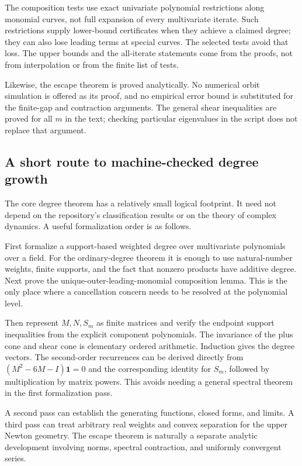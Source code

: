 \documentclass[11pt,a4paper]{article}
\numberwithin{equation}{section}
\theoremstyle{definition}
\theoremstyle{remark}
\newcommand{\one}{\mathbf 1}
\begin{document}
The composition tests use exact univariate polynomial restrictions
along monomial curves, not full expansion of every multivariate
iterate. Such restrictions supply lower-bound certificates when
they achieve a claimed degree; they can also lose leading terms at
special curves. The selected tests avoid that loss. The upper
bounds and the all-iterate statements come from the proofs, not
from interpolation or from the finite list of tests.

Likewise, the escape theorem is proved analytically. No numerical
orbit simulation is offered as its proof, and no empirical error
bound is substituted for the finite-gap and contraction arguments.
The general shear inequalities are proved for all $m$ in the text;
checking particular eigenvalues in the script does not replace that
argument.

\subsection{A short route to machine-checked degree growth}
The core degree theorem has a relatively small logical footprint.
It need not depend on the repository's classification results or
on the theory of complex dynamics. A useful formalization order is
as follows.

First formalize a support-based weighted degree over multivariate
polynomials over a field. For the ordinary-degree theorem it is
enough to use natural-number weights, finite supports, and the
fact that nonzero products have additive degree. Next prove the
unique-outer-leading-monomial composition lemma. This is the only
place where a cancellation concern needs to be resolved at the
polynomial level.

Then represent $M,N,S_m$ as finite matrices and verify the endpoint
support inequalities from the explicit component polynomials.
The invariance of the plus cone and shear cone is elementary
ordered arithmetic. Induction gives the degree vectors. The
second-order recurrences can be derived directly from
$(M^2-6M-I)\one=0$ and the corresponding identity for $S_m$,
followed by multiplication by matrix powers. This avoids needing
a general spectral theorem in the first formalization pass.

A second pass can establish the generating functions, closed forms,
and limits. A third pass can treat arbitrary real weights and
convex separation for the upper Newton geometry. The escape theorem
is naturally a separate analytic development involving norms,
spectral contraction, and uniformly convergent series.
\end{document}
